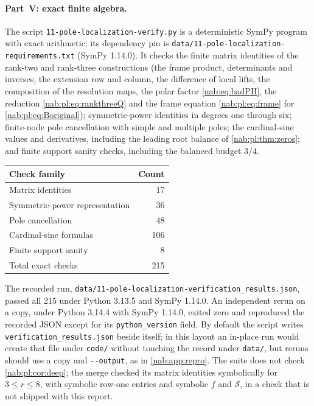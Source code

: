 \documentclass[11pt,letterpaper]{article}
\theoremstyle{definition}
\theoremstyle{remark}
\numberwithin{equation}{section}
\begin{document}
\paragraph{Part~V: exact finite algebra.}
The script \nolinkurl{11-pole-localization-verify.py} is a deterministic SymPy
program with exact arithmetic; its dependency pin is
\nolinkurl{data/11-pole-localization-requirements.txt} (SymPy 1.14.0). It
checks the finite matrix identities of the rank-two and rank-three
constructions (the frame product, determinants and inverses, the extension row
and column, the difference of local lifts, the composition of the resolution
maps, the polar factor \eqref{nab:eq:badPH}, the reduction
\eqref{nab:pl:eq:rankthreeQ} and the frame equation \eqref{nab:pl:eq:frame}
for \eqref{nab:pl:eq:Boriginal}); symmetric-power identities in degrees one
through six; finite-node pole cancellation with simple and multiple poles; the
cardinal-sine values and derivatives, including the leading root balance of
\cref{nab:pl:thm:zeros}; and finite support sanity checks, including the
balanced budget $3/4$.
\begin{center}\small
\begin{tabular}{@{}L{0.71\textwidth}r@{}}
\toprule
Check family & Count\\
\midrule
Matrix identities & 17\\
Symmetric-power representation & 36\\
Pole cancellation & 48\\
Cardinal-sine formulas & 106\\
Finite support sanity & 8\\
\midrule
Total exact checks & 215\\
\bottomrule
\end{tabular}
\end{center}
The recorded run, \nolinkurl{data/11-pole-localization-verification_results.json},
passed all 215 under Python 3.13.5 and SymPy 1.14.0. An independent rerun on a
copy, under Python 3.14.4 with SymPy 1.14.0, exited zero and reproduced the
recorded JSON except for its \texttt{python\_version} field. By default the
script writes \texttt{verification\_results.json} beside itself; in this layout
an in-place run would create that file under \texttt{code/} without touching
the record under \texttt{data/}, but reruns should use a copy and
\texttt{-{}-output}, as in \cref{nab:app:repro}. The suite does not check
\cref{nab:pl:cor:deep}; the merge checked its matrix identities symbolically
for $3\leq r\leq8$, with symbolic row-one entries and symbolic $f$ and
$\mathcal S$, in a check that is not shipped with this report.
\end{document}
